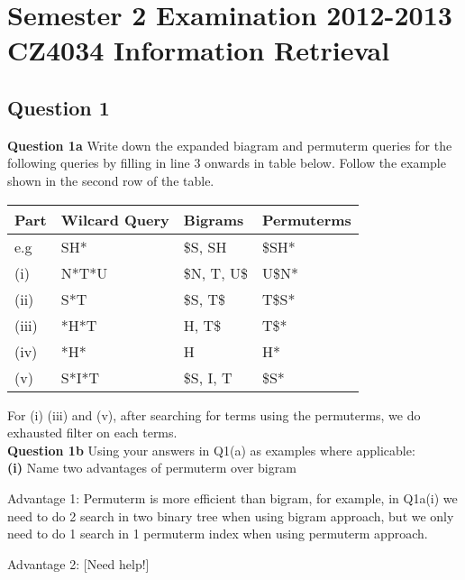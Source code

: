 \documentclass[11pt,a4paper]{report}
\begin{document}
\chapter{Semester 2 Examination 2012-2013\\CZ4034 Information Retrieval}
\begin{multicols*}{2}

\section{Question 1}

\noindent \textbf{Question 1a} Write down the expanded biagram and permuterm queries for the following queries by filling in line 3 onwards in table below. Follow the example shown in the second row of the table.

\begin{center}
\begin{tabular}{| l | l | l | l |}
    \hline
    Part      & Wilcard Query & Bigrams    & Permuterms \\
    \hline
    e.g       & SH*           & \$S, SH     & \$SH* \\
    (i)       & N*T*U         & \$N, T, U\$ & U\$N* \\
    (ii)      & S*T           & \$S, T\$    & T\$S* \\
    (iii)     & *H*T          & H, T\$      & T\$*  \\
    (iv)      & *H*           & H           & H*    \\
    (v)       & S*I*T         & \$S, I, T   & \$S*  \\
    \hline
\end{tabular}
\end{center}

\noindent For (i) (iii) and (v), after searching for terms using the permuterms, we do exhausted filter on each terms.\\

\noindent \textbf{Question 1b} Using your answers in Q1(a) as examples where applicable: \\

\noindent \textbf{(i)} Name two advantages of permuterm over bigram

\noindent Advantage 1: Permuterm is more efficient than bigram, for example, in Q1a(i) we need to do 2 search in two binary tree when using bigram approach, but we only need to do 1 search in 1 permuterm index when using permuterm approach.

\noindent Advantage 2: [Need help!]\\


\end{multicols*}
\end{document}
